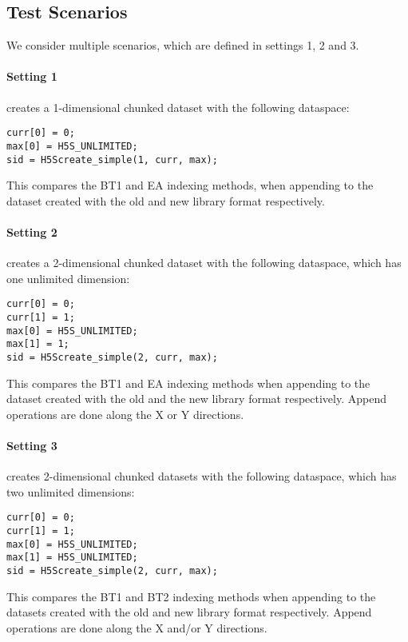 \subsection{Test Scenarios}

We consider multiple scenarios, which are defined in settings 1, 2 and 3.

\paragraph{Setting 1}
creates a 1-dimensional chunked dataset with the following dataspace:

{
\begin{lstlisting}
curr[0] = 0;
max[0] = H5S_UNLIMITED;
sid = H5Screate_simple(1, curr, max);
\end{lstlisting}
}

This compares the BT1 and EA indexing methods, when appending to the dataset
created with the old and new library format respectively.

\paragraph{Setting 2} creates a 2-dimensional chunked dataset with the following
dataspace, which has one unlimited dimension:

{
\begin{lstlisting}
curr[0] = 0;
curr[1] = 1;
max[0] = H5S_UNLIMITED;
max[1] = 1;
sid = H5Screate_simple(2, curr, max);
\end{lstlisting}
}

This compares the BT1 and EA indexing methods when appending to the dataset
created with the old and the new library format respectively.
Append operations are done along the X or Y directions.

\paragraph{Setting 3} creates 2-dimensional chunked datasets with the following
dataspace, which has two unlimited dimensions:

{
\begin{lstlisting}
curr[0] = 0;
curr[1] = 1;
max[0] = H5S_UNLIMITED;
max[1] = H5S_UNLIMITED;
sid = H5Screate_simple(2, curr, max);
\end{lstlisting}
}

This compares the BT1 and BT2 indexing methods when appending to the
datasets created with the old and new library format respectively.
Append operations are done along the X and/or Y directions.

